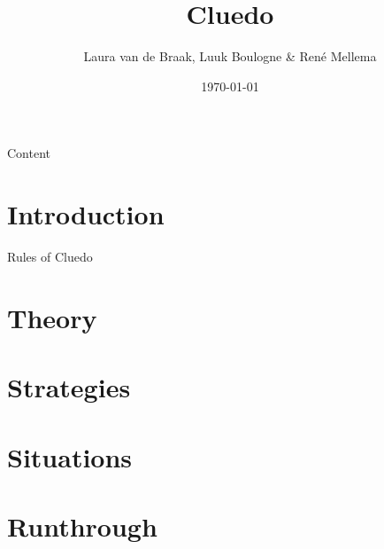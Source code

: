 \documentclass{beamer}
\title{Cluedo}
\author{Laura van de Braak, Luuk Boulogne \& Ren\'e Mellema}
\date{\today}
\begin{document}
\begin{frame}
    \titlepage
\end{frame}

\begin{frame}{Content}
  \tableofcontents
\end{frame}

\section{Introduction}

\begin{frame}{Rules of Cluedo}
  
\end{frame}

\section{Theory}


\section{Strategies}


\section{Situations}

\section{Runthrough}

\end{document}
